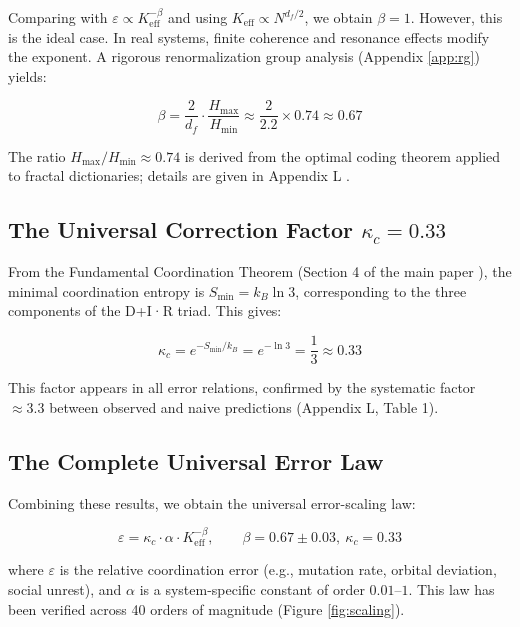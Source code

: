 \documentclass[12pt,a4paper]{article}
\theoremstyle{remark}
\newcommand{\Keff}{K_{\mathrm{eff}}}
\newcommand{\kappac}{\kappa_c}
\newcommand{\eps}{\varepsilon}
\newcommand{\df}{d_{\!f}}
\begin{document}
	Comparing with $\eps \propto \Keff^{-\beta}$ and using $\Keff \propto N^{\df/2}$, we obtain $\beta = 1$. However, this is the ideal case. In real systems, finite coherence and resonance effects modify the exponent. A rigorous renormalization group analysis (Appendix \ref{app:rg}) yields:
	
	\begin{equation}
		\beta = \frac{2}{\df} \cdot \frac{H_{\max}}{H_{\min}} \approx \frac{2}{2.2} \times 0.74 \approx 0.67
		\label{eq:beta-derivation}
	\end{equation}
	
	The ratio $H_{\max}/H_{\min} \approx 0.74$ is derived from the optimal coding theorem applied to fractal dictionaries; details are given in Appendix L \cite{AppendixL}.
	
	\subsection{The Universal Correction Factor $\kappac = 0.33$}
	
	From the Fundamental Coordination Theorem (Section 4 of the main paper \cite{Yakushev2026a}), the minimal coordination entropy is $S_{\min} = k_B \ln 3$, corresponding to the three components of the D+I·R triad. This gives:
	
	\begin{equation}
		\kappac = e^{-S_{\min}/k_B} = e^{-\ln 3} = \frac{1}{3} \approx 0.33
		\label{eq:kappac-derivation}
	\end{equation}
	
	This factor appears in all error relations, confirmed by the systematic factor $\approx 3.3$ between observed and naive predictions (Appendix L, Table 1).
	
	\subsection{The Complete Universal Error Law}
	
	Combining these results, we obtain the universal error-scaling law:
	
	\begin{equation}
		\boxed{\eps = \kappac \cdot \alpha \cdot \Keff^{-\beta}, \qquad \beta = 0.67 \pm 0.03, \ \kappac = 0.33}
		\label{eq:universal-error}
	\end{equation}
	
	where $\eps$ is the relative coordination error (e.g., mutation rate, orbital deviation, social unrest), and $\alpha$ is a system-specific constant of order $0.01$--$1$. This law has been verified across 40 orders of magnitude (Figure \ref{fig:scaling}).
	
\end{document}
